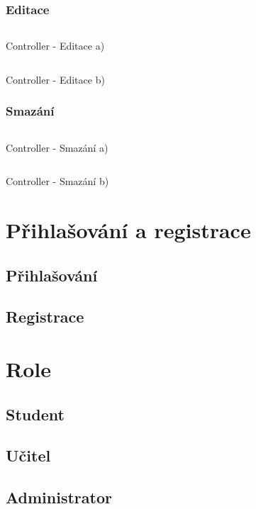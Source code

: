 \documentclass[a4paper, 12pt]{report}
\begin{document}
		\subsection{Editace}
	\begin{listing}[H]
	\inputminted{csharp}{SourceCode/Controllers/Edit.cs}
	\caption{Controller - Editace a)}
	\label{Edit}
	\end{listing}

	\begin{listing}[H]
	\inputminted{csharp}{SourceCode/Controllers/Edit_Post.cs}
	\caption{Controller - Editace b)}
	\label{Edit_Post}
	\end{listing}
		\subsection{Smazání}
	\begin{listing}[H]
	\inputminted{csharp}{SourceCode/Controllers/Delete.cs}
	\caption{Controller - Smazání a)}
	\label{Delete}
	\end{listing}
	\begin{listing}[H]
	\inputminted{csharp}{SourceCode/Controllers/Delete_Post.cs}
	\caption{Controller - Smazání b)}
	\label{Delete_Post}
	\end{listing}
	
	
	\chapter{Přihlašování a registrace}
	\section{Přihlašování}
	\section{Registrace}

	\chapter{Role} \label{Role}
	\section{Student}
	\section{Učitel}
	\section{Administrator}
\end{document}
